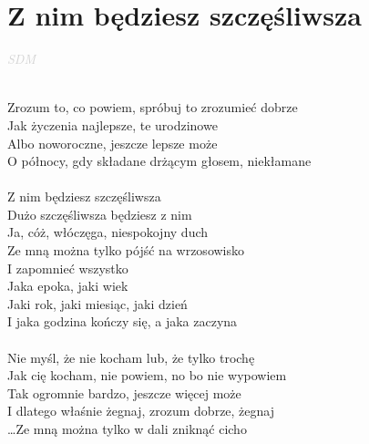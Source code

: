 \documentclass[a5paper, 10pt]{book}
\begin{document}
\newpage
\section{Z nim będziesz szczęśliwsza}\textcolor{lightgray}{\textit{SDM}}\\~\\
\begin{minipage}[t]{0.8\textwidth}
Zrozum to, co powiem, spróbuj to zrozumieć dobrze\\
Jak życzenia najlepsze, te urodzinowe\\
Albo noworoczne, jeszcze lepsze może\\
O północy, gdy składane drżącym głosem, niekłamane\\
\\
\hspace*{5mm}Z nim będziesz szczęśliwsza\\
\hspace*{5mm}Dużo szczęśliwsza będziesz z nim\\
\hspace*{5mm}Ja, cóż, włóczęga, niespokojny duch\\
\hspace*{5mm}Ze mną można tylko pójść na wrzosowisko\\
\hspace*{5mm}I zapomnieć wszystko\\
\hspace*{5mm}Jaka epoka, jaki wiek\\
\hspace*{5mm}Jaki rok, jaki miesiąc, jaki dzień\\
\hspace*{5mm}I jaka godzina kończy się, a jaka zaczyna\\
\\
Nie myśl, że nie kocham lub, że tylko trochę\\
Jak cię kocham, nie powiem, no bo nie wypowiem\\
Tak ogromnie bardzo, jeszcze więcej może\\
I dlatego właśnie żegnaj, zrozum dobrze, żegnaj\\

\ldots Ze mną można tylko w dali zniknąć cicho\\

\end{minipage}
\end{document}

